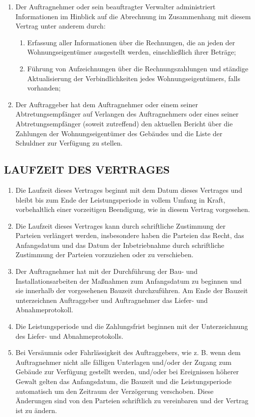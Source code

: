 \begin{multicols}{2}
\begin{enumerate}
   \item Der Auftragnehmer oder sein beauftragter Verwalter administriert Informationen im Hinblick auf die Abrechnung im Zusammenhang mit diesem Vertrag unter anderem durch:
   \begin{enumerate}
   \item Erfassung aller Informationen über die Rechnungen, die an jeden der Wohnungseigentümer ausgestellt werden, einschließlich ihrer Beträge;
   \item Führung von Aufzeichnungen über die Rechnungszahlungen und ständige Aktualisierung der Verbindlichkeiten jedes Wohnungseigentümers, falls vorhanden;
   \end{enumerate}
   \item Der Auftraggeber hat dem Auftragnehmer oder einem seiner Abtretungsempfänger auf Verlangen des Auftragnehmers oder eines seiner Abtretungsempfänger (soweit zutreffend) den aktuellen Bericht über die Zahlungen der Wohnungseigentümer des Gebäudes und die Liste der Schuldner zur Verfügung zu stellen.
   \end{enumerate}

  \subsection{LAUFZEIT DES VERTRAGES}
  \begin{enumerate}
   \item Die Laufzeit dieses Vertrages beginnt mit dem Datum dieses Vertrages und bleibt bis zum Ende der Leistungsperiode in vollem Umfang in Kraft, vorbehaltlich einer vorzeitigen Beendigung, wie in diesem Vertrag vorgesehen.
   \item Die Laufzeit dieses Vertrages kann durch schriftliche Zustimmung der Parteien verlängert werden, insbesondere haben die Parteien das Recht, das Anfangsdatum und das Datum der Inbetriebnahme durch schriftliche Zustimmung der Parteien vorzuziehen oder zu verschieben.
   \item Der Auftragnehmer hat mit der Durchführung der Bau- und Installationsarbeiten der Maßnahmen zum Anfangsdatum zu beginnen und sie innerhalb der vorgesehenen Bauzeit durchzuführen. Am Ende der Bauzeit unterzeichnen Auftraggeber und Auftragnehmer das Liefer- und Abnahmeprotokoll.
   \item Die Leistungsperiode und die Zahlungsfrist beginnen mit der Unterzeichnung des Liefer- und Abnahmeprotokolls.
   \item Bei Versäumnis oder Fahrlässigkeit des Auftraggebers, wie z. B. wenn dem Auftragnehmer nicht alle fälligen Unterlagen und/oder der Zugang zum Gebäude zur Verfügung gestellt werden, und/oder bei Ereignissen höherer Gewalt gelten das Anfangsdatum, die Bauzeit und die Leistungsperiode automatisch um den Zeitraum der Verzögerung verschoben. Diese Änderungen sind von den Parteien schriftlich zu vereinbaren und der Vertrag ist zu ändern.
   \end{enumerate}


\end{multicols}
